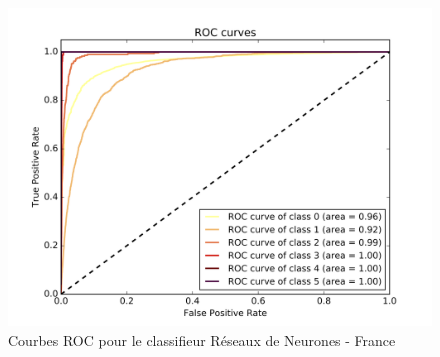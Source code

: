 \documentclass{book}
\begin{document}
\begin{figure}[H]
 \begin{center}
\includegraphics[scale=0.4]{../../data/France/test/Neural_Network_Classification-oversampling/Neural_Network_Classification-oversampling_roc.png}
 \caption{Courbes ROC pour le classifieur Réseaux de Neurones - France}
 \label{nn_roc}
 \end{center}
\end{figure}
\end{document}
